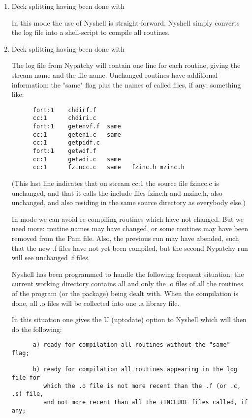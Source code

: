 \begin{enumerate}
\item
Deck splitting having been done with 

In this mode the use of Nyshell is straight-forward, Nyshell simply
converts the log file into a shell-script to compile all routines.


\item
Deck splitting having been done with 

The log file from Nypatchy will contain one line for each routine,
giving the stream name and the file name. Unchanged routines have
additional information:  the "same" flag plus the names of called
 files, if any; something like:
\begin{verbatim}
      fort:1    chdirf.f
      cc:1      chdiri.c
      fort:1    getenvf.f  same
      cc:1      geteni.c   same
      cc:1      getpidf.c
      fort:1    getwdf.f
      cc:1      getwdi.c   same
      cc:1      fzincc.c   same   fzinc.h mzinc.h
\end{verbatim}
(This last line indicates that on stream cc:1 the source file fzincc.c
is unchanged, and that it calls the include files fzinc.h and mzinc.h,
also unchanged, and also residing in the same source directory as
everybody else.)

In  mode we can avoid re-compiling routines which have not changed.
But we need more: routine names may have changed, or some routines may
have been removed from the Pam file. Also, the previous run may have
abended, such that the new .f files have not yet been compiled, but
the second Nypatchy run will see unchanged .f files.

Nyshell has been programmed to handle the following frequent situation:
the current working directory contains all and only the .o files of all
the routines of the program (or the package) being dealt with. When the
compilation is done, all .o files will be collected into one .a library file.

In this situation one gives the U (uptodate) option to Nyshell which will
then do the following:
\begin{verbatim}
      a) ready for compilation all routines without the "same" flag;

      b) ready for compilation all routines appearing in the log file for
         which the .o file is not more recent than the .f (or .c, .s) file,
         and not more recent than all the +INCLUDE files called, if any;


\end{verbatim}
\end{enumerate}
